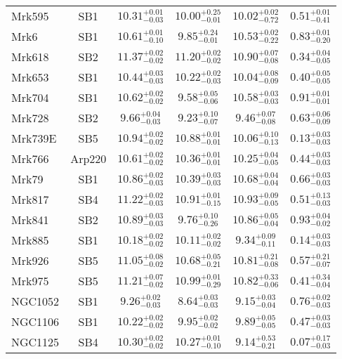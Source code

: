 \documentclass[onecolumn]{mn2e}
\begin{document}
{\begin{center}
\begin{longtable}{lccccc}
Mrk595 & SB1 & $10.31_{-0.03}^{+0.01}$ & $10.00_{-0.01}^{+0.25}$ & $10.02_{-0.72}^{+0.02}$ &$0.51_{-0.41}^{+0.01}$ \\
Mrk6 & SB1 & $10.61_{-0.10}^{+0.01}$ & $9.85_{-0.01}^{+0.24}$ & $10.53_{-0.22}^{+0.02}$ &$0.83_{-0.20}^{+0.01}$ \\
Mrk618 & SB2 & $11.37_{-0.02}^{+0.02}$ & $11.20_{-0.02}^{+0.02}$ & $10.90_{-0.08}^{+0.07}$ &$0.34_{-0.05}^{+0.04}$ \\
Mrk653 & SB1 & $10.44_{-0.03}^{+0.03}$ & $10.22_{-0.03}^{+0.02}$ & $10.04_{-0.09}^{+0.08}$ &$0.40_{-0.05}^{+0.05}$ \\
Mrk704 & SB1 & $10.62_{-0.02}^{+0.02}$ & $9.58_{-0.06}^{+0.05}$ & $10.58_{-0.03}^{+0.03}$ &$0.91_{-0.01}^{+0.01}$ \\
Mrk728 & SB2 & $9.66_{-0.03}^{+0.04}$ & $9.23_{-0.07}^{+0.10}$ & $9.46_{-0.08}^{+0.07}$ &$0.63_{-0.09}^{+0.06}$ \\
Mrk739E & SB5 & $10.94_{-0.02}^{+0.02}$ & $10.88_{-0.01}^{+0.01}$ & $10.06_{-0.13}^{+0.10}$ &$0.13_{-0.03}^{+0.03}$ \\
Mrk766 & Arp220 & $10.61_{-0.02}^{+0.02}$ & $10.36_{-0.01}^{+0.01}$ & $10.25_{-0.05}^{+0.04}$ &$0.44_{-0.03}^{+0.03}$ \\
Mrk79 & SB1 & $10.86_{-0.03}^{+0.02}$ & $10.39_{-0.03}^{+0.03}$ & $10.68_{-0.04}^{+0.04}$ &$0.66_{-0.03}^{+0.03}$ \\
Mrk817 & SB4 & $11.22_{-0.03}^{+0.02}$ & $10.91_{-0.15}^{+0.01}$ & $10.93_{-0.05}^{+0.09}$ &$0.51_{-0.03}^{+0.13}$ \\
Mrk841 & SB2 & $10.89_{-0.03}^{+0.03}$ & $9.76_{-0.26}^{+0.10}$ & $10.86_{-0.04}^{+0.05}$ &$0.93_{-0.02}^{+0.04}$ \\
Mrk885 & SB1 & $10.18_{-0.02}^{+0.02}$ & $10.11_{-0.02}^{+0.02}$ & $9.34_{-0.11}^{+0.09}$ &$0.14_{-0.03}^{+0.03}$ \\
Mrk926 & SB5 & $11.05_{-0.02}^{+0.08}$ & $10.68_{-0.21}^{+0.05}$ & $10.81_{-0.08}^{+0.21}$ &$0.57_{-0.07}^{+0.21}$ \\
Mrk975 & SB5 & $11.21_{-0.02}^{+0.07}$ & $10.99_{-0.29}^{+0.01}$ & $10.82_{-0.06}^{+0.33}$ &$0.41_{-0.04}^{+0.34}$ \\
NGC1052 & SB1 & $9.26_{-0.03}^{+0.02}$ & $8.64_{-0.03}^{+0.03}$ & $9.15_{-0.04}^{+0.03}$ &$0.76_{-0.03}^{+0.02}$ \\
NGC1106 & SB1 & $10.22_{-0.02}^{+0.02}$ & $9.95_{-0.02}^{+0.02}$ & $9.89_{-0.05}^{+0.05}$ &$0.47_{-0.03}^{+0.03}$ \\
NGC1125 & SB4 & $10.30_{-0.02}^{+0.02}$ & $10.27_{-0.10}^{+0.01}$ & $9.14_{-0.21}^{+0.53}$ &$0.07_{-0.03}^{+0.17}$ \\

\end{longtable}
\end{center}}
\end{document}

